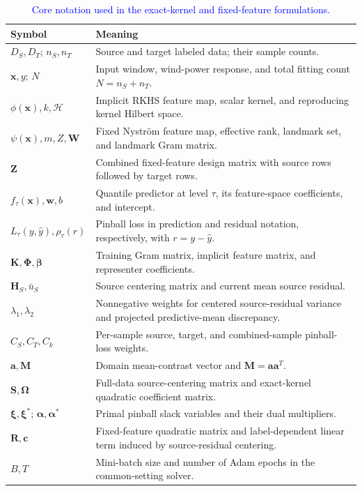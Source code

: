 \begin{table}[pos=htbp,width=\FullWidth]
\centering
\caption{\textcolor{blue}{Core notation used in the exact-kernel and fixed-feature formulations.}}
\label{tab:notation}
{\color{blue}\small
\begin{tabular}{p{}p{}}
\toprule
Symbol & Meaning \\
\midrule
$D_S,D_T$; $n_S,n_T$ & Source and target labeled data; their sample counts. \\
$\boldsymbol{x},y$; $N$ & Input window, wind-power response, and total fitting count $N=n_S+n_T$. \\
$\phi(\boldsymbol{x}),k,\mathcal H$ & Implicit RKHS feature map, scalar kernel, and reproducing kernel Hilbert space. \\
$\psi(\boldsymbol{x}),m,Z,\boldsymbol W$ & Fixed Nystr\"{o}m feature map, effective rank, landmark set, and landmark Gram matrix. \\
$\boldsymbol Z$ & Combined fixed-feature design matrix with source rows followed by target rows. \\
$f_\tau(\boldsymbol{x}),\boldsymbol w,b$ & Quantile predictor at level $\tau$, its feature-space coefficients, and intercept. \\
$L_\tau(y,\hat y),\rho_\tau(r)$ & Pinball loss in prediction and residual notation, respectively, with $r=y-\hat y$. \\
$\boldsymbol K,\boldsymbol\Phi,\boldsymbol\beta$ & Training Gram matrix, implicit feature matrix, and representer coefficients. \\
$\boldsymbol H_S,\bar u_S$ & Source centering matrix and current mean source residual. \\
$\lambda_1,\lambda_2$ & Nonnegative weights for centered source-residual variance and projected predictive-mean discrepancy. \\
$C_S,C_T,C_k$ & Per-sample source, target, and combined-sample pinball-loss weights. \\
$\boldsymbol a,\boldsymbol M$ & Domain mean-contrast vector and $\boldsymbol M=\boldsymbol a\boldsymbol a^T$. \\
$\boldsymbol S,\boldsymbol\Omega$ & Full-data source-centering matrix and exact-kernel quadratic coefficient matrix. \\
$\boldsymbol\xi,\boldsymbol\xi^*$; $\boldsymbol\alpha,\boldsymbol\alpha^*$ & Primal pinball slack variables and their dual multipliers. \\
$\boldsymbol R,\boldsymbol c$ & Fixed-feature quadratic matrix and label-dependent linear term induced by source-residual centering. \\
$B,T$ & Mini-batch size and number of Adam epochs in the common-setting solver. \\
\bottomrule
\end{tabular}}
\end{table}
